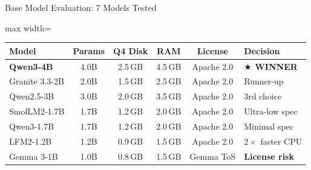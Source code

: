 \documentclass[aspectratio=169,11pt]{beamer}
\newcommand{\hlc}[1]{{\color{crimson}\bfseries #1}}
\begin{document}
\begin{frame}[shrink=15]{Base Model Evaluation: 7 Models Tested}

\begin{center}
\begin{adjustbox}{max width=\textwidth}
\begin{tabular}{@{}lccccl@{}}
  \toprule
  \textbf{Model} & \textbf{Params} & \textbf{Q4 Disk} & \textbf{RAM} & \textbf{License} & \textbf{Decision}\\
  \midrule
  \rowcolor{goldsoft}\textbf{Qwen3-4B} & 4.0B & 2.5\,GB & 4.5\,GB & Apache 2.0 & \textbf{$\bigstar$ WINNER}\\
  Granite 3.3-2B & 2.0B & 1.5\,GB & 2.5\,GB & Apache 2.0 & Runner-up\\
  Qwen2.5-3B & 3.0B & 2.0\,GB & 3.5\,GB & Apache 2.0 & 3rd choice\\
  SmolLM2-1.7B & 1.7B & 1.2\,GB & 2.0\,GB & Apache 2.0 & Ultra-low spec\\
  Qwen3-1.7B & 1.7B & 1.2\,GB & 2.0\,GB & Apache 2.0 & Minimal spec\\
  LFM2-1.2B & 1.2B & 0.9\,GB & 1.5\,GB & Apache 2.0 & $2\times$ faster CPU\\
  Gemma 3-1B & 1.0B & 0.8\,GB & 1.5\,GB & Gemma ToS & \hlc{License risk}\\
  \bottomrule
\end{tabular}
\end{adjustbox}
\end{center}


\end{frame}
\end{document}
